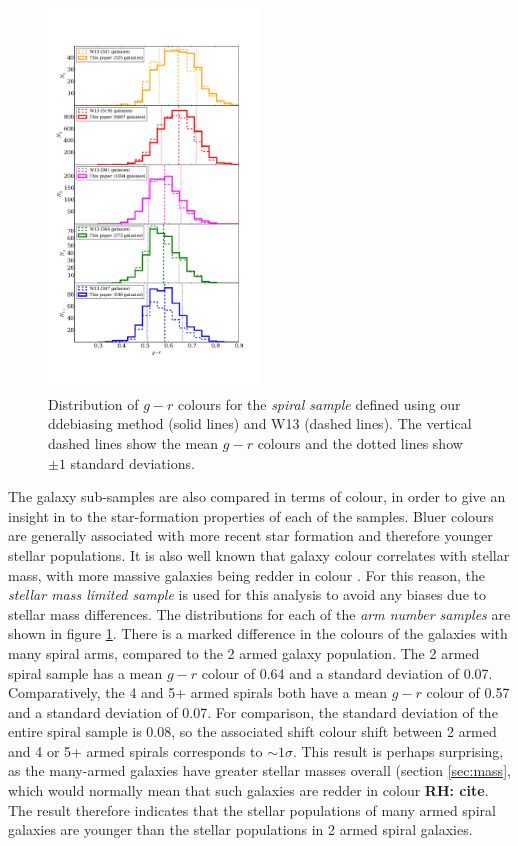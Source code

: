 \documentclass[useAMS,usenatbib]{mn2e}
\newcommand{\rh}[1]{{\bf \textcolor{RoyalPurple}{RH: #1}}}
\begin{document}
\begin{figure}
		\centering
		
        \includegraphics[width=0.5\textwidth]{Histograms/colour_histogram.pdf}
		
        \caption{Distribution of $g-r$ colours for the \textit{spiral sample} defined using our ddebiasing method (solid lines) and W13 (dashed lines). The vertical dashed lines show the mean $g-r$ colours and the dotted lines show $\pm1$ standard deviations.}
		
        \label{fig:colour_histogram}
        
\end{figure}

The galaxy sub-samples are also compared in terms of colour, in order to give an insight in to the star-formation properties of each of the samples. Bluer colours are generally associated with more recent star formation and therefore younger stellar populations. It is also well known that galaxy colour correlates with stellar mass, with more massive galaxies being redder in colour \citep{Baldry_06}. For this reason, the \textit{stellar mass limited sample} is used for this analysis to avoid any biases due to stellar mass differences. The distributions for each of the \textit{arm number samples} are shown in figure \ref{fig:colour_histogram}. There is a marked difference in the colours of the galaxies with many spiral arms, compared to the 2 armed galaxy population. The 2 armed spiral sample has a mean $g-r$ colour of 0.64 and a standard deviation of 0.07. Comparatively, the 4 and 5+ armed spirals both have a mean $g-r$ colour of 0.57 and a standard deviation of 0.07. For comparison, the standard deviation of the entire spiral sample is 0.08, so the associated shift colour shift between 2 armed and 4 or 5+ armed spirals corresponds to $\sim 1 \sigma$. This result is perhaps surprising, as the many-armed galaxies have greater stellar masses overall (section \ref{sec:mass}, which would normally mean that such galaxies are redder in colour \rh{cite}. The result therefore indicates that the stellar populations of many armed spiral galaxies are younger than the stellar populations in 2 armed spiral galaxies. 
\end{document}
